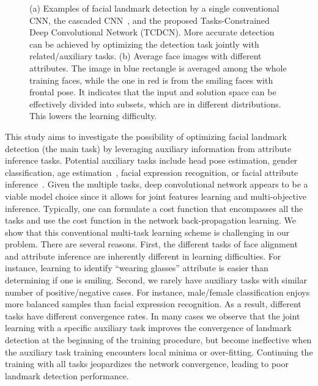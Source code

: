 \documentclass[10pt,journal,compsoc]{IEEEtran}
\begin{document}
\begin{figure*}[t]
\centering
{}
\caption{(a) Examples of facial landmark detection by a single conventional CNN, the cascaded CNN~\cite{Sun2013}, and the proposed Tasks-Constrained Deep Convolutional Network (TCDCN). More accurate detection can be achieved by optimizing the detection task jointly with related/auxiliary tasks. (b) Average face images with different attributes. The image in blue rectangle is averaged among the whole training faces, while the one in red is from the smiling faces with frontal pose. It indicates that the input and solution space can be effectively divided into subsets, which are in different distributions. This lowers the learning difficulty.}

\label{fig:highlight} \end{figure*}

This study aims to investigate the possibility of optimizing facial landmark detection (the main task) by leveraging auxiliary information from attribute inference tasks. Potential auxiliary tasks include head pose estimation, gender classification, age estimation~\cite{ChenCVPR2013}, facial expression recognition, or facial attribute inference~\cite{aqatagfa23}.
Given the multiple tasks, deep convolutional network appears to be a viable model choice since it allows for joint features learning and multi-objective inference. Typically, one can formulate a cost function that encompasses all the tasks and use the cost function in the network back-propagation learning.
We show that this conventional multi-task learning scheme is challenging in our problem. There are several reasons. First, the different tasks of face alignment and attribute inference are inherently different in learning difficulties. For instance, learning to identify ``wearing glasses'' attribute is easier than determining if one is smiling. Second, we rarely have auxiliary tasks with similar number of positive/negative cases. For instance, male/female classification enjoys more balanced samples than facial expression recognition.
As a result, different tasks have different convergence rates. In many cases we observe that the joint learning with a specific auxiliary task improves the convergence of landmark detection at the beginning of the training procedure, but become ineffective when the auxiliary task training encounters local minima or over-fitting. Continuing the training with all tasks jeopardizes the network convergence, leading to poor landmark detection performance.
\end{document}
